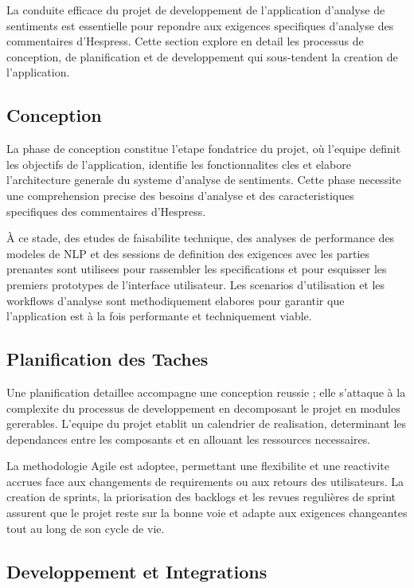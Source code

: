 La conduite efficace du projet de developpement de l'application d'analyse de sentiments est essentielle pour repondre aux exigences specifiques d'analyse des commentaires d'Hespress. Cette section explore en detail les processus de conception, de planification et de developpement qui sous-tendent la creation de l'application.

\subsection{Conception}

La phase de conception constitue l'etape fondatrice du projet, où l'equipe definit les objectifs de l'application, identifie les fonctionnalites cles et elabore l'architecture generale du systeme d'analyse de sentiments. Cette phase necessite une comprehension precise des besoins d'analyse et des caracteristiques specifiques des commentaires d'Hespress.

À ce stade, des etudes de faisabilite technique, des analyses de performance des modeles de NLP et des sessions de definition des exigences avec les parties prenantes sont utilisees pour rassembler les specifications et pour esquisser les premiers prototypes de l'interface utilisateur. Les scenarios d'utilisation et les workflows d'analyse sont methodiquement elabores pour garantir que l'application est à la fois performante et techniquement viable.

\subsection{Planification des Taches}

Une planification detaillee accompagne une conception reussie ; elle s'attaque à la complexite du processus de developpement en decomposant le projet en modules gererables. L'equipe du projet etablit un calendrier de realisation, determinant les dependances entre les composants et en allouant les ressources necessaires.

La methodologie Agile est adoptee, permettant une flexibilite et une reactivite accrues face aux changements de requirements ou aux retours des utilisateurs. La creation de sprints, la priorisation des backlogs et les revues regulières de sprint assurent que le projet reste sur la bonne voie et adapte aux exigences changeantes tout au long de son cycle de vie.

\subsection{Developpement et Integrations}

